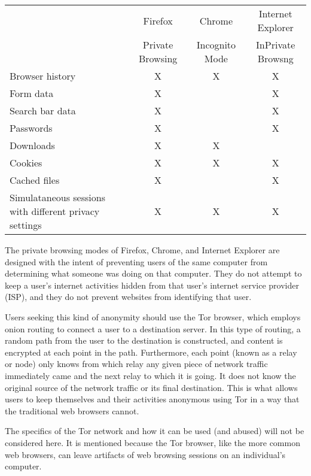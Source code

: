 \documentclass[pdftex,letterpaper,12pt]{article}
\begin{document}
    \singlespacing
    \begin{center}
      \begin{tabular}{|p{5cm}|c|c|c|}
        \hline
         & Firefox & Chrome & Internet Explorer \\
         & Private Browsing & Incognito Mode & InPrivate Browsng \\
        \hline
        Browser history & X & X & X \\
        \hline
        Form data & X &  & X \\
        \hline
        Search bar data & X &  & X \\
        \hline
        Passwords & X &  & X \\
        \hline
        Downloads & X & X &  \\
        \hline
        Cookies & X & X & X \\
        \hline
        Cached files & X &  & X \\
        \hline
        Simulataneous sessions with different privacy settings & X & X & X \\
        \hline
      \end{tabular}
    \end{center}
    \doublespacing

    The private browsing modes of Firefox, Chrome, and Internet Explorer are
    designed with the intent of preventing users of the same computer from
    determining what someone was doing on that computer. They do not attempt
    to keep a user's internet activities hidden from that user's internet
    service provider (ISP), and they do not prevent websites from identifying
    that user.\cite{verdi13}\cite{google13}\cite{ie13}

    Users seeking this kind of anonymity should use the Tor browser, which
    employs onion routing to connect a user to a destination server. In this
    type of routing, a random path from the user to the destination is
    constructed, and content is encrypted at each point in the path.
    Furthermore, each point (known as a relay or node) only knows from which
    relay any given piece of network traffic immediately came and the next
    relay to which it is going. It does not know the original source of the
    network traffic or its final destination. This is what allows users to keep
    themselves and their activities anonymous using Tor in a way that the 
    traditional web browsers cannot.\cite{tor13}

    The specifics of the Tor network and how it can be used (and abused) will
    not be considered here. It is mentioned because the Tor browser, like the
    more common web browsers, can leave artifacts of web browsing sessions on
    an individual's computer.
    
\end{document}
